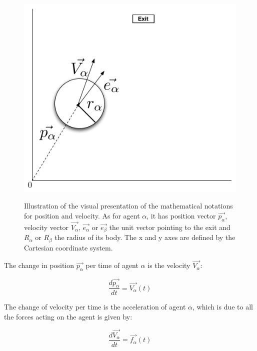 \begin{figure}[hb]
    \centering
    {\includegraphics[scale=0.35]{Figures/NotationOfAgent.pdf}} 
    \caption[Notation of an agent]{Illustration of the visual presentation of 
    the mathematical notations for position and velocity. As for agent $ 
    \alpha $, it has position vector $ \overrightarrow{p_{\alpha}} $, velocity vector $ 
    \overrightarrow{V_{\alpha}} $, $\overrightarrow{e_{\alpha}}$ or $\overrightarrow{e_{\beta}}$ the unit 
    vector pointing to the exit and  $ R_{\alpha} $ or  $ R_{\beta} $ the 
    radius of its body.  The x and y axes are defined by the Cartesian 
    coordinate system.}
    \label{fig:NotationOfAgent}
\end{figure}

The change in position $ \overrightarrow{p_{\alpha}} $ per time of agent $\alpha$ is the 
velocity $ \overrightarrow{V_{\alpha}} $:

\begin{equation}
		\frac{d \overrightarrow{p_{\alpha}}}{dt} = \overrightarrow{V_{\alpha}} \left( t \right)
\end{equation}

The change of velocity per time is the acceleration of agent $\alpha$, which 
is due to all the forces acting on the agent is given by:

\begin{equation}
    \frac{d \overrightarrow{V_{\alpha}}}{dt} = \overrightarrow{f_{\alpha}} \left( t \right) 
\end{equation}

